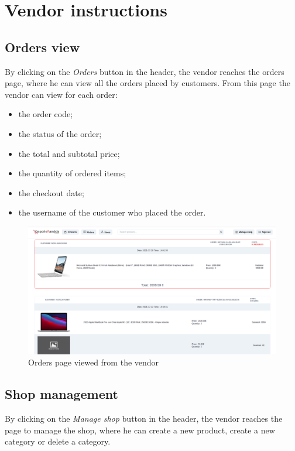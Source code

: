 \section{Vendor instructions}
\subsection{Orders view}
By clicking on the \textit{Orders} button in the header, the vendor reaches the orders page, where he can view all the orders placed by customers.
\newline
From this page the vendor can view for each order:
\begin{itemize}
    \item the order code;
    \item the status of the order;
    \item the total and subtotal price;
    \item the quantity of ordered items;
    \item the checkout date;
    \item the username of the customer who placed the order.
\end{itemize}
\begin{figure}[!ht]
    \caption{Orders page viewed from the vendor}
    \vspace{5px}
    \includegraphics[scale=0.25]{../../../../Images/userManual/ordersVendor.png}
    \centering
\end{figure}
\pagebreak
\subsection{Shop management}
By clicking on the \textit{Manage shop} button in the header, the vendor reaches the page to manage the shop, where he can create a new product, create a new category or delete a category.
